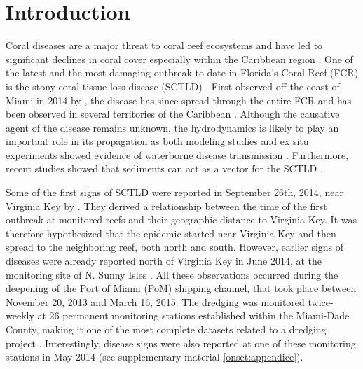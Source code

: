 \section{Introduction}

Coral diseases are a major threat to coral reef ecosystems and have led to significant declines in coral cover especially within the Caribbean region \citep{richardson1998coral, sutherland2004disease, aronson2001white, harvell2007coral, brandt2009dynamics}. One of the latest and the most damaging outbreak to date in Florida's Coral Reef (FCR) is the stony coral tissue loss disease (SCTLD) \citep{noaa2018}. First observed off the coast of Miami in 2014 by \cite{precht2016unprecedented}, the disease has since spread through the entire FCR \citep{muller2020spatial,dobbelaere2022connecting} and has been observed in several territories of the Caribbean \citep{kramer2019map, meiling2021variable, estrada2021effects,heres2021ecological}. Although the causative agent of the disease remains unknown, the hydrodynamics is likely to play an important role in its propagation as both modeling studies and ex situ experiments showed evidence of waterborne disease transmission \citep{aeby2019pathogenesis,dobbelaere2020coupled,eaton2021measuring, meiling2021variable}. Furthermore, recent studies showed that sediments can act as  a vector for the SCTLD \citep{rosales2020rhodobacterales, studivan2022reef}.

Some of the first signs of SCTLD were reported in September 26th, 2014, near Virginia Key by \cite{precht2016unprecedented}. They derived a relationship between the time of the first outbreak at monitored reefs and their geographic distance to Virginia Key. It was therefore hypothesized that the epidemic started near Virginia Key and then spread to the neighboring reef, both north and south. However, earlier signs of diseases were already reported north of Virginia Key in June 2014, at the monitoring site of N. Sunny Isles \citep{precht2016unprecedented}. All these observations occurred during the deepening of the Port of Miami (PoM) shipping channel, that took place between November 20, 2013 and March 16, 2015. The dredging was monitored twice-weekly at 26 permanent monitoring stations established within the Miami-Dade County, making it one of the most complete datasets related to a dredging project \citep{gintert2019regional}. Interestingly, disease signs were also reported at one of these monitoring stations in May 2014 (see supplementary material \ref{onset:appendice}).


